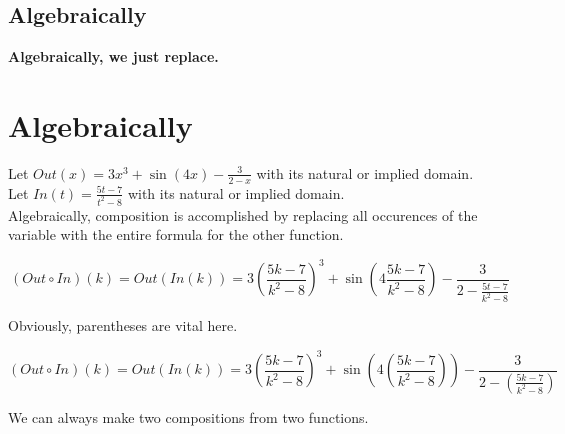 \documentclass{ximera}
\begin{document}
\subsection*{Algebraically}










\textbf{\textcolor{purple!85!blue}{Algebraically, we just replace.}}

















\section*{Algebraically}







Let $Out(x) = 3x^3 + \sin(4x) - \frac{3}{2-x}$ with its natural or implied domain. \\
Let $In(t) = \frac{5t-7}{t^2-8}$ with its natural or implied domain. \\



Algebraically, composition is accomplished by replacing all occurences of the variable with the entire formula for the other function.




\[
(Out \circ In)(k) = Out(In(k)) = 3 \left( \frac{5k-7}{k^2-8} \right)^3 + \sin(4 \frac{5k-7}{k^2-8}) - \frac{3}{2-\frac{5t-7}{k^2-8}}
\]





Obviously, parentheses are vital here.





\[
(Out \circ In)(k) = Out(In(k)) = 3 \left( \frac{5k-7}{k^2-8} \right)^3 + \sin\left( 4 \left( \frac{5k-7}{k^2-8} \right) \right) - \frac{3}{2 - \left( \frac{5k-7}{k^2-8} \right)}
\]






We can always make two compositions from two functions.
\end{document}

